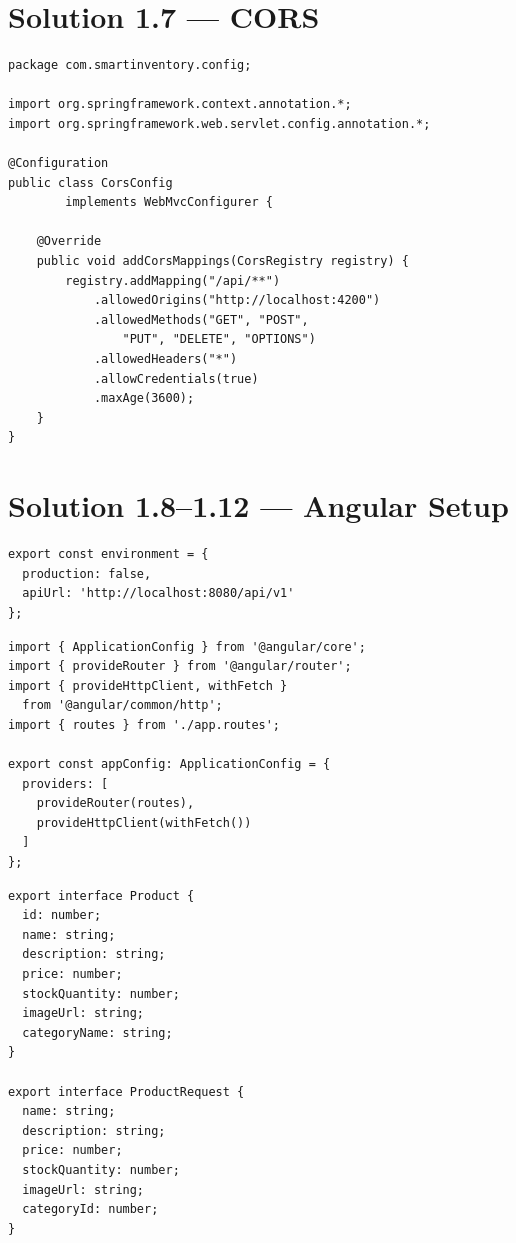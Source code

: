 \documentclass[12pt,a4paper]{report}
\begin{document}
\section{Solution 1.7 --- CORS}

\begin{lstlisting}[style=javastyle, title={config/CorsConfig.java}]
package com.smartinventory.config;

import org.springframework.context.annotation.*;
import org.springframework.web.servlet.config.annotation.*;

@Configuration
public class CorsConfig
        implements WebMvcConfigurer {

    @Override
    public void addCorsMappings(CorsRegistry registry) {
        registry.addMapping("/api/**")
            .allowedOrigins("http://localhost:4200")
            .allowedMethods("GET", "POST",
                "PUT", "DELETE", "OPTIONS")
            .allowedHeaders("*")
            .allowCredentials(true)
            .maxAge(3600);
    }
}
\end{lstlisting}

\section{Solution 1.8--1.12 --- Angular Setup}

\begin{lstlisting}[style=tsstyle, title={src/environments/environment.development.ts}]
export const environment = {
  production: false,
  apiUrl: 'http://localhost:8080/api/v1'
};
\end{lstlisting}

\begin{lstlisting}[style=tsstyle, title={src/app/app.config.ts}]
import { ApplicationConfig } from '@angular/core';
import { provideRouter } from '@angular/router';
import { provideHttpClient, withFetch }
  from '@angular/common/http';
import { routes } from './app.routes';

export const appConfig: ApplicationConfig = {
  providers: [
    provideRouter(routes),
    provideHttpClient(withFetch())
  ]
};
\end{lstlisting}

\begin{lstlisting}[style=tsstyle, title={features/products/models/product.model.ts}]
export interface Product {
  id: number;
  name: string;
  description: string;
  price: number;
  stockQuantity: number;
  imageUrl: string;
  categoryName: string;
}

export interface ProductRequest {
  name: string;
  description: string;
  price: number;
  stockQuantity: number;
  imageUrl: string;
  categoryId: number;
}
\end{lstlisting}
\end{document}

